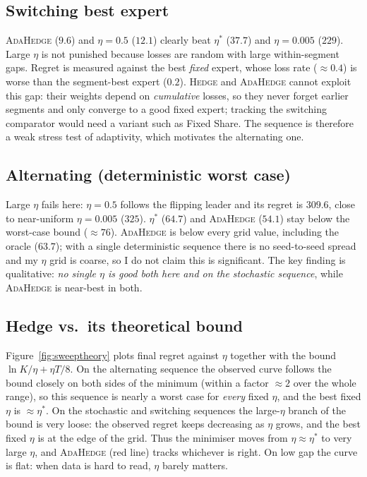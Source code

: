 \documentclass[11pt,a4paper]{article}
\newcommand{\Hedge}{\textsc{Hedge}}
\newcommand{\Ada}{\textsc{AdaHedge}}
\newcommand{\lnK}{\ln K}
\begin{document}
\subsection{Switching best expert}
\Ada{} ($9.6$) and $\eta=0.5$ ($12.1$) clearly beat $\eta^*$ ($37.7$) and $\eta=0.005$ ($229$). Large $\eta$ is not punished because losses are random with large within-segment gaps.
Regret is measured against the best \emph{fixed} expert, whose loss rate ($\approx0.4$) is worse than the segment-best expert ($0.2$). \Hedge{} and \Ada{} cannot exploit this gap: their weights depend on \emph{cumulative} losses, so they never forget earlier segments and only converge to a good fixed expert; tracking the switching comparator would need a variant such as Fixed Share. The sequence is therefore a weak stress test of adaptivity, which motivates the alternating one.

\subsection{Alternating (deterministic worst case)}
Large $\eta$ fails here: $\eta=0.5$ follows the flipping leader and its regret is $309.6$, close to near-uniform $\eta=0.005$ ($325$).
$\eta^*$ ($64.7$) and \Ada{} ($54.1$) stay below the worst-case bound ($\approx76$). \Ada{} is below every grid value, including the oracle ($63.7$); with a single deterministic sequence there is no seed-to-seed spread and my $\eta$ grid is coarse, so I do not claim this is significant.
The key finding is qualitative: \emph{no single $\eta$ is good both here and on the stochastic sequence}, while \Ada{} is near-best in both.

\subsection{Hedge vs.\ its theoretical bound}\label{sec:sweep}
Figure~\ref{fig:sweeptheory} plots final regret against $\eta$ together with the bound $\lnK/\eta+\eta T/8$. On the alternating sequence the observed curve follows the bound closely on both sides of the minimum (within a factor $\approx2$ over the whole range), so this sequence is nearly a worst case for \emph{every} fixed $\eta$, and the best fixed $\eta$ is $\approx\eta^*$.
On the stochastic and switching sequences the large-$\eta$ branch of the bound is very loose: the observed regret keeps decreasing as $\eta$ grows, and the best fixed $\eta$ is at the edge of the grid.
Thus the minimiser moves from $\eta\approx\eta^*$ to very large $\eta$, and \Ada{} (red line) tracks whichever is right. On low gap the curve is flat: when data is hard to read, $\eta$ barely matters.
\end{document}
